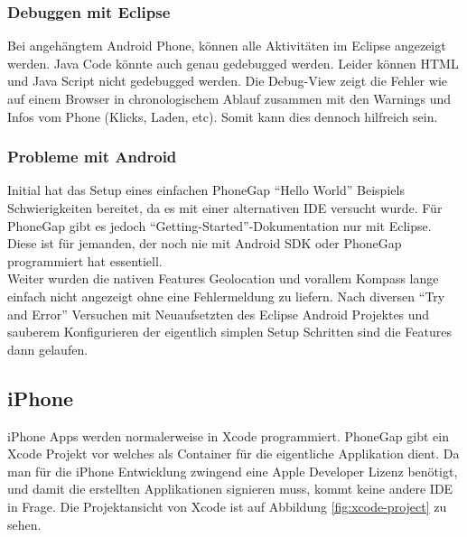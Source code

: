 \subsubsection{Debuggen mit Eclipse} %
\label{ssub:Debuggen mit Eclipse}
Bei angehängtem Android Phone, können alle Aktivitäten im Eclipse angezeigt werden. Java Code könnte auch genau gedebugged werden. Leider können HTML und Java Script nicht gedebugged werden. Die Debug-View zeigt die Fehler wie auf einem Browser in chronologischem Ablauf zusammen mit den Warnings und Infos vom Phone (Klicks, Laden, etc). Somit kann dies dennoch hilfreich sein. 

\subsubsection{Probleme mit Android} %
\label{ssub:probleme_mit_android}
Initial hat das Setup eines einfachen PhoneGap "`Hello World"' Beispiels Schwierigkeiten bereitet, da es mit einer alternativen IDE versucht wurde. Für PhoneGap gibt es jedoch "`Getting-Started"'-Dokumentation nur mit Eclipse. Diese ist für jemanden, der noch nie mit Android SDK oder PhoneGap programmiert hat essentiell. \\
Weiter wurden die nativen Features Geolocation und vorallem Kompass lange einfach nicht angezeigt ohne eine Fehlermeldung zu liefern. Nach diversen "`Try and Error"' Versuchen mit Neuaufsetzten des Eclipse Android Projektes und sauberem Konfigurieren der eigentlich simplen Setup Schritten sind die Features dann gelaufen. 


\subsection{iPhone} %
\label{sub:iPhone}
iPhone Apps werden normalerweise in Xcode programmiert. PhoneGap gibt ein Xcode Projekt vor welches als Container für die eigentliche Applikation dient. Da man für die iPhone Entwicklung zwingend eine Apple Developer Lizenz benötigt, und damit die erstellten Applikationen signieren muss, kommt keine andere IDE in Frage. Die Projektansicht von Xcode ist auf Abbildung \ref{fig:xcode-project} zu sehen.

